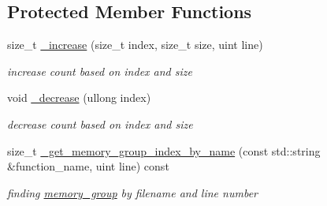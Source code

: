 \subsection*{Protected Member Functions}
\begin{DoxyCompactItemize}
\item 
\mbox{\label{classminerva_1_1foundation_1_1memory__tracker_a821e4d5c9e9e077861d561d918b3218c}} 
size\+\_\+t \hyperlink{classminerva_1_1foundation_1_1memory__tracker_a821e4d5c9e9e077861d561d918b3218c}{\+\_\+increase} (size\+\_\+t index, size\+\_\+t size, uint line)
\begin{DoxyCompactList}\small\item\em increase count based on index and size \end{DoxyCompactList}\item 
\mbox{\label{classminerva_1_1foundation_1_1memory__tracker_afb9e4a478044a8ceae79b5cccf3dbf0c}} 
void \hyperlink{classminerva_1_1foundation_1_1memory__tracker_afb9e4a478044a8ceae79b5cccf3dbf0c}{\+\_\+decrease} (ullong index)
\begin{DoxyCompactList}\small\item\em decrease count based on index and size \end{DoxyCompactList}\item 
\mbox{\label{classminerva_1_1foundation_1_1memory__tracker_af1ca0ea6da700237e944807eee244795}} 
size\+\_\+t \hyperlink{classminerva_1_1foundation_1_1memory__tracker_af1ca0ea6da700237e944807eee244795}{\+\_\+get\+\_\+memory\+\_\+group\+\_\+index\+\_\+by\+\_\+name} (const std\+::string \&function\+\_\+name, uint line) const
\begin{DoxyCompactList}\small\item\em finding \hyperlink{structminerva_1_1foundation_1_1memory__tracker_1_1memory__group}{memory\+\_\+group} by filename and line number \end{DoxyCompactList}\end{DoxyCompactItemize}
